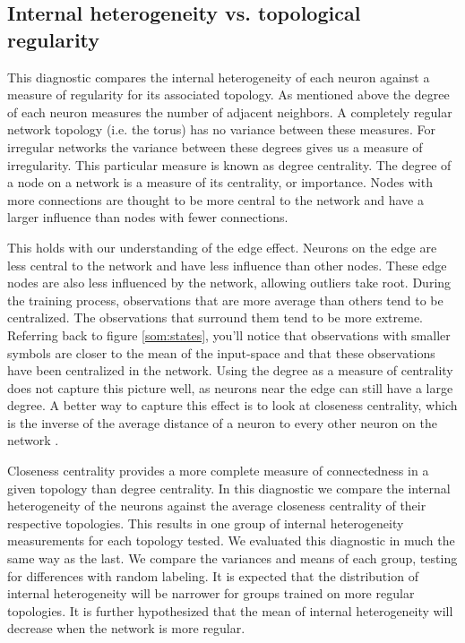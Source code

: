 \subsection{Internal heterogeneity vs. topological regularity}
This diagnostic compares the internal heterogeneity of each neuron against a
measure of regularity for its associated topology.  As mentioned above the
degree of each neuron measures the number of adjacent neighbors.  A completely
regular network topology (i.e. the torus) has no variance between these
measures.  For irregular networks the variance between these degrees gives us
a measure of irregularity. This particular measure is known as degree
centrality.  The degree of a node on a network is a measure of its centrality, or
importance. Nodes with more connections are thought to be more central to the
network and have a larger influence than nodes with fewer connections.

This holds with our understanding of the edge effect.  Neurons on the edge are
less central to the network and have less influence than other nodes.  These
edge nodes are also less influenced by the network, allowing outliers take
root.  During the training process, observations that are more average than
others tend to be centralized.  The observations that surround them tend to be
more extreme.  Referring back to figure \ref{som:states}, you'll notice
that observations with smaller symbols are closer to the mean of the
input-space and that these observations have been centralized in the network.
Using the degree as a measure of centrality does not capture this picture
well, as neurons near the edge can still have a large degree.  A better way to
capture this effect is to look at closeness centrality, which is the
inverse of the average distance of a neuron to every other neuron on the
network \citep{Wasserman:1994}.

Closeness centrality provides a more complete measure of connectedness in a
given topology than degree centrality.  In this diagnostic we compare the
internal heterogeneity of the neurons against the average closeness centrality
of their respective topologies.  This results in one group of internal
heterogeneity measurements for each topology tested.  We evaluated this
diagnostic in much the same way as the last.  We compare the variances and
means of each group, testing for differences with random labeling.  It is
expected that the distribution of internal heterogeneity will be narrower for
groups trained on more regular topologies.  It is further hypothesized that
the mean of internal heterogeneity will decrease when the network is more
regular.  %

